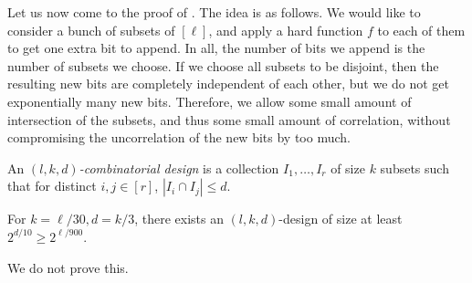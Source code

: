 		Let us now come to the proof of . The idea is as follows. We would like to consider a bunch of subsets of $[\ell]$, and apply a hard function $f$ to each of them to get one extra bit to append. In all, the number of bits we append is the number of subsets we choose. If we choose all subsets to be disjoint, then the resulting new bits are completely independent of each other, but we do not get exponentially many new bits. Therefore, we allow some small amount of intersection of the subsets, and thus some small amount of correlation, without compromising the uncorrelation of the new bits by too much.

		\begin{fdef}
			An \emph{$(l,k,d)$-combinatorial design} is a collection $I_1,\ldots,I_r$ of size $k$ subsets such that for distinct $i,j \in [r]$, $|I_i \cap I_j| \le d$.
		\end{fdef}

		\begin{fprop}
			For $k=\ell/30, d=k/3$, there exists an $(l,k,d)$-design of size at least $2^{d/10} \ge 2^{\ell/900}$.
		\end{fprop}
		We do not prove this.

